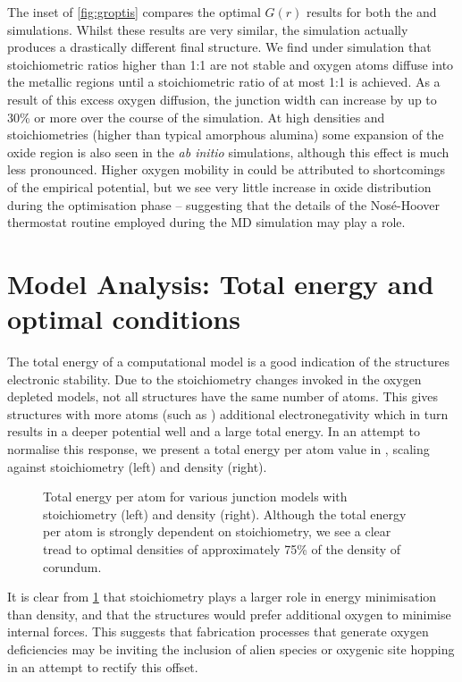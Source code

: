 The inset of \cref{fig:groptis} compares the optimal $G(r)$ results for both the  and  simulations.
Whilst these results are very similar, the  simulation actually produces a drastically different final structure.
We find under  simulation that stoichiometric ratios higher than 1:1 are not stable and oxygen atoms diffuse into the metallic regions until a stoichiometric ratio of at most 1:1 is achieved.
As a result of this excess oxygen diffusion, the junction width can increase by up to 30\% or more over the course of the simulation.
At high densities and stoichiometries (higher than typical amorphous alumina) some expansion of the oxide region is also seen in the \textit{ab initio} simulations, although this effect is much less pronounced.
Higher oxygen mobility in  could be attributed to shortcomings of the empirical potential, but we see very little increase in oxide distribution during the optimisation phase -- suggesting that the details of the Nos\'{e}-Hoover thermostat routine employed during the MD simulation may play a role.

\section{Model Analysis{\rmfamily :} Total energy and optimal conditions}
The total energy of a computational model is a good indication of the structures electronic stability.
Due to the stoichiometry changes invoked in the oxygen depleted models, not all structures have the same number of atoms.
This gives structures with more atoms (such as ) additional electronegativity which in turn results in a deeper potential well and a large total energy.
In an attempt to normalise this response, we present a total energy per atom value in , scaling against stoichiometry (left) and density (right).

\begin{figure}[tbh]
\centering
\caption{\label{fig:energy}Total energy per atom for various junction models with stoichiometry (left) and density (right).  Although the total energy per atom is strongly dependent on stoichiometry, we see a clear tread to optimal densities of approximately 75\% of the density of corundum.}%
\end{figure}

It is clear from \cref{fig:energy} that stoichiometry plays a larger role in energy minimisation than density, and that the structures would prefer additional oxygen to minimise internal forces.
This suggests that fabrication processes that generate oxygen deficiencies may be inviting the inclusion of alien species or oxygenic site hopping in an attempt to rectify this offset.

